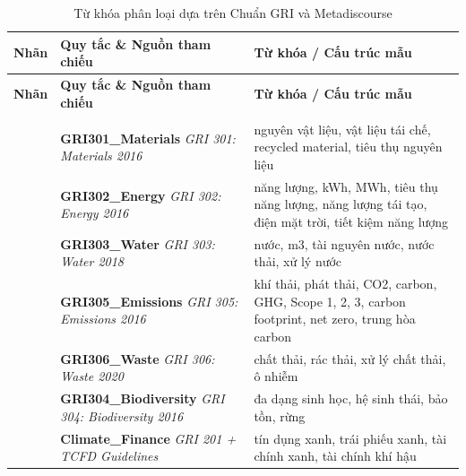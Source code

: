 \begin{longtable}{|p{2cm}|p{5cm}|p{7cm}|}
\caption{Từ khóa phân loại dựa trên Chuẩn GRI và Metadiscourse}\\

\hline
\textbf{Nhãn} & \textbf{Quy tắc \& Nguồn tham chiếu} & \textbf{Từ khóa / Cấu trúc mẫu} \\
\hline
\endfirsthead

\hline
\textbf{Nhãn} & \textbf{Quy tắc \& Nguồn tham chiếu} & \textbf{Từ khóa / Cấu trúc mẫu} \\
\hline
\endhead

\hline
\endfoot

\hline
\endlastfoot

\multicolumn{3}{|l|}{\textbf{E (Môi trường)}} \\
\hline
\multirow{1}{*}{} & \textbf{GRI301\_Materials} \newline \textit{GRI 301: Materials 2016} & nguyên vật liệu, vật liệu tái chế, recycled material, tiêu thụ nguyên liệu \\
\hline
\multirow{1}{*}{} & \textbf{GRI302\_Energy} \newline \textit{GRI 302: Energy 2016} & năng lượng, kWh, MWh, tiêu thụ năng lượng, năng lượng tái tạo, điện mặt trời, tiết kiệm năng lượng \\
\hline
\multirow{1}{*}{} & \textbf{GRI303\_Water} \newline \textit{GRI 303: Water 2018} & nước, m3, tài nguyên nước, nước thải, xử lý nước \\
\hline
\multirow{1}{*}{} & \textbf{GRI305\_Emissions} \newline \textit{GRI 305: Emissions 2016} & khí thải, phát thải, CO2, carbon, GHG, Scope 1, 2, 3, carbon footprint, net zero, trung hòa carbon \\
\hline
\multirow{1}{*}{} & \textbf{GRI306\_Waste} \newline \textit{GRI 306: Waste 2020} & chất thải, rác thải, xử lý chất thải, ô nhiễm \\
\hline
\multirow{1}{*}{} & \textbf{GRI304\_Biodiversity} \newline \textit{GRI 304: Biodiversity 2016} & đa dạng sinh học, hệ sinh thái, bảo tồn, rừng \\
\hline
\multirow{1}{*}{} & \textbf{Climate\_Finance} \newline \textit{GRI 201 + TCFD Guidelines} & tín dụng xanh, trái phiếu xanh, tài chính xanh, tài chính khí hậu \\
\hline


\end{longtable}

